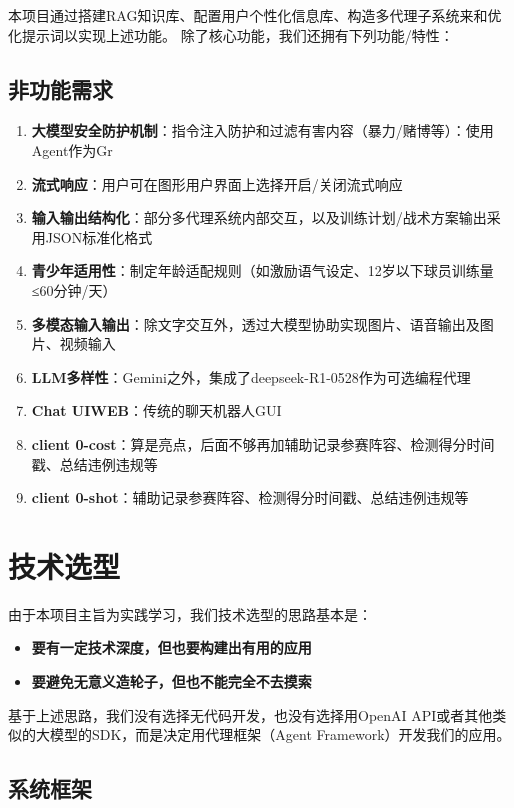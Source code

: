\documentclass{article}
\theoremstyle{plain}
\theoremstyle{definition}
\theoremstyle{remark}
\begin{document}
本项目通过搭建RAG知识库、配置用户个性化信息库、构造多代理子系统来和优化提示词以实现上述功能。
除了核心功能，我们还拥有下列功能/特性：

\subsection{非功能需求}
\begin{enumerate}
    \item \textbf{大模型安全防护机制}：指令注入防护和过滤有害内容（暴力/赌博等）：使用Agent作为Gr
    \item \textbf{流式响应}：用户可在图形用户界面上选择开启/关闭流式响应
    \item \textbf{输入输出结构化}：部分多代理系统内部交互，以及训练计划/战术方案输出采用JSON标准化格式
    \item \textbf{青少年适用性}：制定年龄适配规则（如激励语气设定、12岁以下球员训练量≤60分钟/天）
    \item \textbf{多模态输入输出}：除文字交互外，透过大模型协助实现图片、语音输出及图片、视频输入
    \item \textbf{LLM多样性}：Gemini之外，集成了deepseek-R1-0528作为可选编程代理
    \item \textbf{Chat UI\ADK WEB}：传统的聊天机器人GUI
    \item \textbf{client 0-cost}：算是亮点，后面不够再加辅助记录参赛阵容、检测得分时间戳、总结违例违规等
    \item \textbf{client 0-shot}：辅助记录参赛阵容、检测得分时间戳、总结违例违规等
\end{enumerate}

\section{技术选型}
由于本项目主旨为实践学习，我们技术选型的思路基本是：
\begin{itemize}
    \item \textbf{要有一定技术深度，但也要构建出有用的应用}
    \item \textbf{要避免无意义造轮子，但也不能完全不去摸索}
\end{itemize}

基于上述思路，我们没有选择无代码开发，也没有选择用OpenAI API或者其他类似的大模型的SDK，而是决定用代理框架（Agent Framework）开发我们的应用。

\subsection{系统框架}
\end{document}
